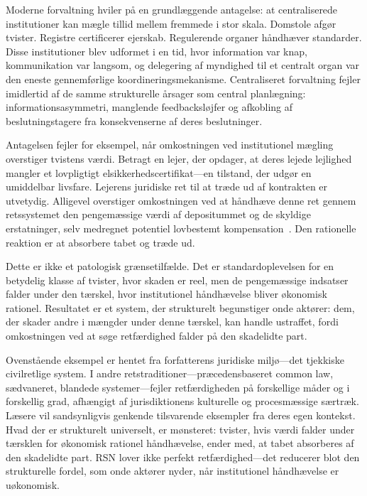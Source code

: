 \documentclass[11pt,a4paper,twocolumn]{article}
\begin{document}
Moderne forvaltning hviler på en grundlæggende antagelse: at centraliserede institutioner kan mægle tillid mellem fremmede i stor skala. Domstole afgør tvister. Registre certificerer ejerskab. Regulerende organer håndhæver standarder. Disse institutioner blev udformet i en tid, hvor information var knap, kommunikation var langsom, og delegering af myndighed til et centralt organ var den eneste gennemførlige koordineringsmekanisme. Centraliseret forvaltning fejler imidlertid af de samme strukturelle årsager som central planlægning: informationsasymmetri, manglende feedbacksløjfer og afkobling af beslutningstagere fra konsekvenserne af deres beslutninger.

Antagelsen fejler for eksempel, når omkostningen ved institutionel mægling overstiger tvistens værdi. Betragt en lejer, der opdager, at deres lejede lejlighed mangler et lovpligtigt elsikkerhedscertifikat---en tilstand, der udgør en umiddelbar livsfare. Lejerens juridiske ret til at træde ud af kontrakten er utvetydig. Alligevel overstiger omkostningen ved at håndhæve denne ret gennem retssystemet den pengemæssige værdi af depositummet og de skyldige erstatninger, selv medregnet potentiel lovbestemt kompensation~\cite{czcourtfees}. Den rationelle reaktion er at absorbere tabet og træde ud.

Dette er ikke et patologisk grænsetilfælde. Det er standardoplevelsen for en betydelig klasse af tvister, hvor skaden er reel, men de pengemæssige indsatser falder under den tærskel, hvor institutionel håndhævelse bliver økonomisk rationel. Resultatet er et system, der strukturelt begunstiger onde aktører: dem, der skader andre i mængder under denne tærskel, kan handle ustraffet, fordi omkostningen ved at søge retfærdighed falder på den skadelidte part.

Ovenstående eksempel er hentet fra forfatterens juridiske miljø---det tjekkiske civilretlige system. I andre retstraditioner---præcedensbaseret common law, sædvaneret, blandede systemer---fejler retfærdigheden på forskellige måder og i forskellig grad, afhængigt af jurisdiktionens kulturelle og procesmæssige særtræk. Læsere vil sandsynligvis genkende tilsvarende eksempler fra deres egen kontekst. Hvad der er strukturelt universelt, er mønsteret: tvister, hvis værdi falder under tærsklen for økonomisk rationel håndhævelse, ender med, at tabet absorberes af den skadelidte part. RSN lover ikke perfekt retfærdighed---det reducerer blot den strukturelle fordel, som onde aktører nyder, når institutionel håndhævelse er uøkonomisk.
\end{document}
